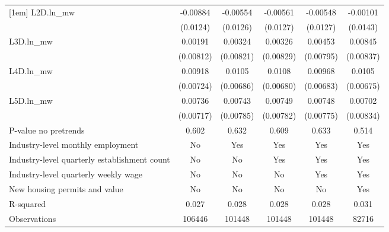 {\begin{tabular}{l*{5}{c}}
[1em]
L2D.ln\_mw & -0.00884         & -0.00554         & -0.00561         & -0.00548         & -0.00101         \\
          & (0.0124)         & (0.0126)         & (0.0127)         & (0.0127)         & (0.0143)         \\
[1em]
L3D.ln\_mw &  0.00191         &  0.00324         &  0.00326         &  0.00453         &  0.00845         \\
          &(0.00812)         &(0.00821)         &(0.00829)         &(0.00795)         &(0.00837)         \\
[1em]
L4D.ln\_mw &  0.00918         &   0.0105         &   0.0108         &  0.00968         &   0.0105         \\
          &(0.00724)         &(0.00686)         &(0.00680)         &(0.00683)         &(0.00675)         \\
[1em]
L5D.ln\_mw &  0.00736         &  0.00743         &  0.00749         &  0.00748         &  0.00702         \\
          &(0.00717)         &(0.00785)         &(0.00782)         &(0.00775)         &(0.00834)         \\
\hline
P-value no pretrends&    0.602         &    0.632         &    0.609         &    0.633         &    0.514         \\
Industry-level monthly employment&       No         &      Yes         &      Yes         &      Yes         &      Yes         \\
Industry-level quarterly establishment count&       No         &       No         &      Yes         &      Yes         &      Yes         \\
Industry-level quarterly weekly wage&       No         &       No         &       No         &      Yes         &      Yes         \\
New housing permits and value&       No         &       No         &       No         &       No         &      Yes         \\
R-squared &    0.027         &    0.028         &    0.028         &    0.028         &    0.031         \\
Observations&   106446         &   101448         &   101448         &   101448         &    82716         \\
\hline\hline
\end{tabular}
}
